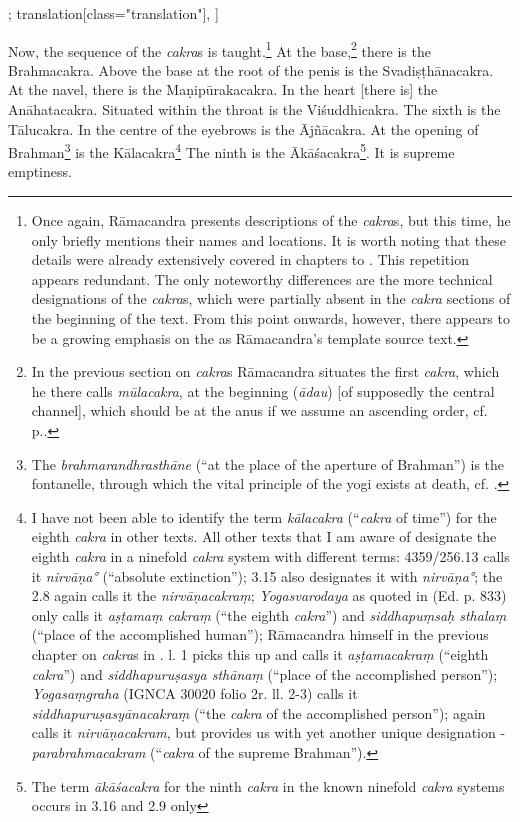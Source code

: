 \begin{alignment}[
  texts=edition[class="edition"];
  translation[class="translation"],
  ]
\begin{translation}
\begin{tlate}[p29_01]
      Now, the sequence of the \textit{cakra}s is taught.\footnote{Once again, Rāmacandra presents descriptions of the \textit{cakra}s, but this time, he only briefly mentions their names and locations. It is worth noting that these details were already extensively covered in chapters  to . This repetition appears redundant. The only noteworthy differences are the more technical designations of the \textit{cakra}s, which were partially absent in the \textit{cakra} sections of the beginning of the text. From this point onwards, however, there appears to be a growing emphasis on the  as Rāmacandra's template source text.} At the base,\footnote{In the previous section on \textit{cakra}s Rāmacandra situates the first \textit{cakra}, which he there calls \textit{mūlacakra}, at the beginning (\textit{ādau}) [of supposedly the central channel], which should be at the anus if we assume an ascending order, cf. p.\pageref{cakra1}.} there is the Brahmacakra. Above the base at the root of the penis is the Svadiṣṭhānacakra. At the navel, there is the Maṇipūrakacakra. In the heart [there is] the Anāhatacakra. Situated within the throat is the Viśuddhicakra. The sixth is the Tālucakra. In the centre of the eyebrows is the Ājñācakra. At the opening of Brahman\footnote{The \textit{brahmarandhrasthāne} (``at the place of the aperture of Brahman'') is the fontanelle, through which the vital principle of the yogi exists at death, cf. \citeauthor[2017:438]{rootsofyoga2017}.} is the Kālacakra\footnote{I have not been able to identify the term \textit{kālacakra} (``\textit{cakra} of time'') for the eighth \textit{cakra} in other texts. All other texts that I am aware of designate the eighth \textit{cakra} in a ninefold \textit{cakra} system with different terms:  4359/256.13 calls it \textit{nirvāṇa°} (``absolute extinction'');  3.15 also designates it with \textit{nirvāṇa°}; the  2.8 again calls it the \textit{nirvāṇacakraṃ}; \textit{Yogasvarodaya} as quoted in  (Ed. p. 833) only calls it \textit{aṣṭamaṃ cakraṃ} (``the eighth \textit{cakra}'') and \textit{siddhapuṃsaḥ sthalaṃ} (``place of the accomplished human''); Rāmacandra himself in the previous chapter on \textit{cakra}s in . l. 1 picks this up and calls it \textit{aṣṭamacakraṃ} (``eighth \textit{cakra}'') and \textit{siddhapuruṣasya sthānaṃ} (``place of the accomplished person''); \textit{Yogasaṃgraha} (IGNCA 30020 folio 2r. ll. 2-3) calls it \textit{siddhapuruṣasyānacakraṃ} (``the \textit{cakra} of the accomplished person'');  again calls it \textit{nirvāṇacakram}, but provides us with yet another unique designation - \textit{parabrahmacakram} (``\textit{cakra} of the supreme Brahman'').} The ninth is the Ākāśacakra\footnote{The term \textit{ākāśacakra} for the ninth \textit{cakra} in the known ninefold \textit{cakra} systems occurs in  3.16 and  2.9 only}. It is supreme emptiness.

\end{tlate}
\end{translation}
\end{alignment}
